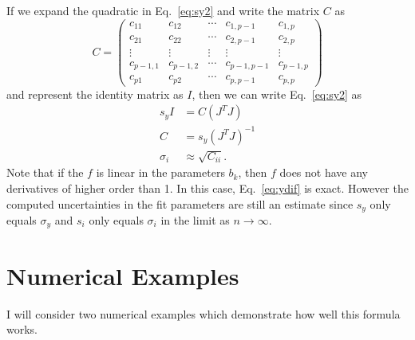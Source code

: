 \documentclass{scrartcl}
\begin{document}
If we expand the quadratic in Eq.~\ref{eq:sy2} and write the matrix
$C$ as
\begin{equation}
C = \left(\begin{array}{ccccc}
c_{11} & c_{12} & \cdots & c_{1,p-1} & c_{1,p} \\
c_{21} & c_{22} & \cdots & c_{2,p-1} & c_{2,p} \\
\vdots & \vdots & \vdots & \vdots & \vdots \\
c_{p-1,1} & c_{p-1,2} & \cdots & c_{p-1,p-1} & c_{p-1,p} \\
c_{p1} & c_{p2} & \cdots & c_{p,p-1} & c_{p,p}
\end{array}\right)
\end{equation}
and represent the identity matrix as $I$, then we can write
Eq.~\ref{eq:sy2} as
\begin{align}
s_y I &= C (J^{T}J)\\
C &= s_y (J^{T}J)^{-1}\\
\sigma_i &\approx \sqrt{C_{ii}}.
\end{align}
Note that if the $f$ is linear in the parameters $b_k$, then
$f$ does not have any derivatives of higher order than 1. In
this case, Eq.~\ref{eq:ydif} is exact. However the computed
uncertainties in the fit parameters are still an estimate since
$s_y$ only equals $\sigma_y$
and $s_i$ only equals $\sigma_i$
in the limit as $n\rightarrow\infty$.

\section{Numerical Examples}
I will consider two numerical examples which demonstrate how
well this formula works.
\end{document}
